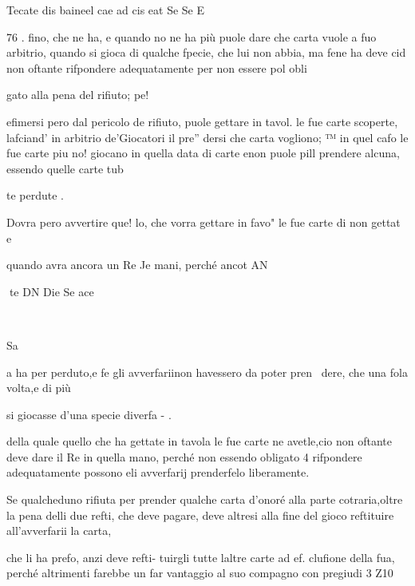 \documentclass[12pt,a6paper]{article}
\begin{document}
 

Tecate dis baineel cae ad cis eat Se Se E

 

 
 

 

 

 

 

76 .
fino, che ne ha, e quando no
ne ha più puole dare che carta
vuole a fuo arbitrio, quando si
gioca di qualche fpecie, che lui
non abbia, ma fene ha deve cid
non oftante rifpondere adequatamente per non essere pol obli

gato alla pena del rifiuto; pe!

efimersi pero dal pericolo de
rifiuto, puole gettare in tavol.
le fue carte scoperte, lafciand'
in arbitrio de’Giocatori il pre”
dersi che carta vogliono; ™
in quel cafo le fue carte piu no!
giocano in quella data di carte
enon puole pill prendere
alcuna, essendo quelle carte tub

te perdute .

Dovra pero avvertire que!
lo, che vorra gettare in favo"
le fue carte di non gettat e

quando avra ancora un Re
Je mani, perché ancot AN

 
te DN Die Se ace

~

Sa

 

 

a
ha per perduto,e fe gli avverfariinon havessero da poter pren~
dere, che una fola volta,e di più

si giocasse d’una specie diverfa - .

della quale quello che ha gettate in tavola le fue carte ne
avetle,cio non oftante deve dare il Re in quella mano, perché
non essendo obligato 4 rifpondere adequatamente possono eli
avverfarij prenderfelo liberamente.

Se qualcheduno rifiuta per
prender qualche carta d’onoré
alla parte cotraria,oltre la pena
delli due refti, che deve pagare,
deve altresi alla fine del gioco
reftituire all’avverfarii la carta,

che li ha prefo, anzi deve refti- 
tuirgli tutte laltre carte ad ef.
clufione della fua, perché altrimenti farebbe un far vantaggio
al suo compagno con pregiudi
3 Z10

 

 

 
\end{document}
